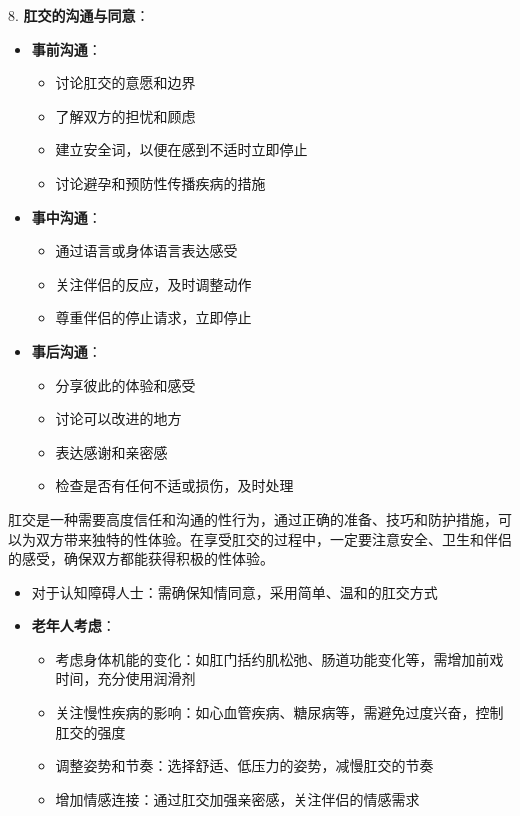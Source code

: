 \documentclass[12pt,UTF8]{ctexbook}
\begin{document}
8. \textbf{肛交的沟通与同意}：
\begin{itemize}
	\item \textbf{事前沟通}：
	\begin{itemize}
		\item 讨论肛交的意愿和边界
		\item 了解双方的担忧和顾虑
		\item 建立安全词，以便在感到不适时立即停止
		\item 讨论避孕和预防性传播疾病的措施
	\end{itemize}
	\item \textbf{事中沟通}：
	\begin{itemize}
		\item 通过语言或身体语言表达感受
		\item 关注伴侣的反应，及时调整动作
		\item 尊重伴侣的停止请求，立即停止
	\end{itemize}
	\item \textbf{事后沟通}：
	\begin{itemize}
		\item 分享彼此的体验和感受
		\item 讨论可以改进的地方
		\item 表达感谢和亲密感
		\item 检查是否有任何不适或损伤，及时处理
	\end{itemize}
\end{itemize}

肛交是一种需要高度信任和沟通的性行为，通过正确的准备、技巧和防护措施，可以为双方带来独特的性体验。在享受肛交的过程中，一定要注意安全、卫生和伴侣的感受，确保双方都能获得积极的性体验。
\begin{itemize}
	\item 对于认知障碍人士：需确保知情同意，采用简单、温和的肛交方式
\end{itemize}
\begin{itemize}
	\item \textbf{老年人考虑}：
	\begin{itemize}
		\item 考虑身体机能的变化：如肛门括约肌松弛、肠道功能变化等，需增加前戏时间，充分使用润滑剂
		\item 关注慢性疾病的影响：如心血管疾病、糖尿病等，需避免过度兴奋，控制肛交的强度
		\item 调整姿势和节奏：选择舒适、低压力的姿势，减慢肛交的节奏
		\item 增加情感连接：通过肛交加强亲密感，关注伴侣的情感需求
	\end{itemize}
\end{itemize}
\end{document}
